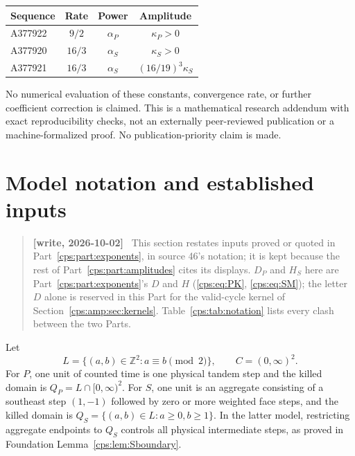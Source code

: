 \documentclass[11pt,letterpaper]{article}
\numberwithin{equation}{section}
\theoremstyle{remark}\newtheorem{remark}[theorem]{Remark}
\newcommand{\ZZ}{\mathbb Z}
\newenvironment{writenote}{\begin{quote}\small\sloppy\textbf{[write, 2026-10-02]}\ }{\end{quote}}
\begin{document}
\begin{center}
\begin{tabular}{@{}lccc@{}}
\toprule
Sequence & Rate & Power & Amplitude\\
\midrule
A377922 & $9/2$ & $\alpha_P$ & $\kappa_P>0$\\
A377920 & $16/3$ & $\alpha_S$ & $\kappa_S>0$\\
A377921 & $16/3$ & $\alpha_S$ & $(16/19)^3\kappa_S$\\
\bottomrule
\end{tabular}
\end{center}
No numerical evaluation of these constants, convergence rate, or further coefficient correction is claimed. This is a mathematical research addendum with exact reproducibility checks, not an externally peer-reviewed publication or a machine-formalized proof. No publication-priority claim is made.

\section{Model notation and established inputs}\label{cps:amp:sec:inputs}

\begin{writenote}
This section restates inputs proved or quoted in Part~\ref{cps:part:exponents}, in
source 46's notation; it is kept because the rest of Part~\ref{cps:part:amplitudes} cites its
displays. $D_P$ and $H_S$ here are Part~\ref{cps:part:exponents}'s $D$ and $H$
(\eqref{cps:eq:PK}, \eqref{cps:eq:SM}); the letter $D$ alone is reserved in this Part for the
valid-cycle kernel of Section~\ref{cps:amp:sec:kernels}. Table~\ref{cps:tab:notation} lists every
clash between the two Parts.
\end{writenote}
Let
\begin{equation}
 L=\{(a,b)\in\ZZ^2:a\equiv b\pmod2\},\qquad
 C=(0,\infty)^2.
\end{equation}
For $P$, one unit of counted time is one physical tandem step and the killed domain is $Q_P=L\cap[0,\infty)^2$. For $S$, one unit is an aggregate consisting of a southeast step $(1,-1)$ followed by zero or more weighted face steps, and the killed domain is $Q_S=\{(a,b)\in L:a\ge0,b\ge1\}$. In the latter model, restricting aggregate endpoints to $Q_S$ controls all physical intermediate steps, as proved in Foundation Lemma~\ref{cps:lem:Sboundary}.
\end{document}
